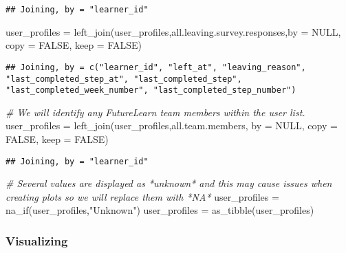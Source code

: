\documentclass[
]{article}
\newenvironment{Shaded}{\begin{snugshade}}{\end{snugshade}}
\newcommand{\AttributeTok}[1]{\textcolor[rgb]{0.77,0.63,0.00}{#1}}
\newcommand{\CommentTok}[1]{\textcolor[rgb]{0.56,0.35,0.01}{\textit{#1}}}
\newcommand{\ConstantTok}[1]{\textcolor[rgb]{0.00,0.00,0.00}{#1}}
\newcommand{\FunctionTok}[1]{\textcolor[rgb]{0.00,0.00,0.00}{#1}}
\newcommand{\NormalTok}[1]{#1}
\newcommand{\OtherTok}[1]{\textcolor[rgb]{0.56,0.35,0.01}{#1}}
\newcommand{\StringTok}[1]{\textcolor[rgb]{0.31,0.60,0.02}{#1}}
\begin{document}
\begin{verbatim}
## Joining, by = "learner_id"
\end{verbatim}

\begin{Shaded}
\begin{Highlighting}[]
\NormalTok{user\_profiles }\OtherTok{=} \FunctionTok{left\_join}\NormalTok{(user\_profiles,all.leaving.survey.responses,}\AttributeTok{by =} \ConstantTok{NULL}\NormalTok{, }\AttributeTok{copy =} \ConstantTok{FALSE}\NormalTok{, }\AttributeTok{keep =} \ConstantTok{FALSE}\NormalTok{)}
\end{Highlighting}
\end{Shaded}

\begin{verbatim}
## Joining, by = c("learner_id", "left_at", "leaving_reason", "last_completed_step_at", "last_completed_step", "last_completed_week_number", "last_completed_step_number")
\end{verbatim}

\begin{Shaded}
\begin{Highlighting}[]
\CommentTok{\# We will identify any FutureLearn team members within the user list.}
\NormalTok{user\_profiles }\OtherTok{=} \FunctionTok{left\_join}\NormalTok{(user\_profiles,all.team.members, }\AttributeTok{by =} \ConstantTok{NULL}\NormalTok{, }\AttributeTok{copy =} \ConstantTok{FALSE}\NormalTok{, }\AttributeTok{keep =} \ConstantTok{FALSE}\NormalTok{)}
\end{Highlighting}
\end{Shaded}

\begin{verbatim}
## Joining, by = "learner_id"
\end{verbatim}

\begin{Shaded}
\begin{Highlighting}[]
\CommentTok{\# Several values are displayed as *unknown* and this may cause issues when creating plots so we will replace them with *NA*}
\NormalTok{user\_profiles }\OtherTok{=} \FunctionTok{na\_if}\NormalTok{(user\_profiles,}\StringTok{"Unknown"}\NormalTok{)}
\NormalTok{user\_profiles }\OtherTok{=} \FunctionTok{as\_tibble}\NormalTok{(user\_profiles)}
\end{Highlighting}
\end{Shaded}

\hypertarget{visualizing}{%
\subsubsection{Visualizing}\label{visualizing}}
\end{document}
